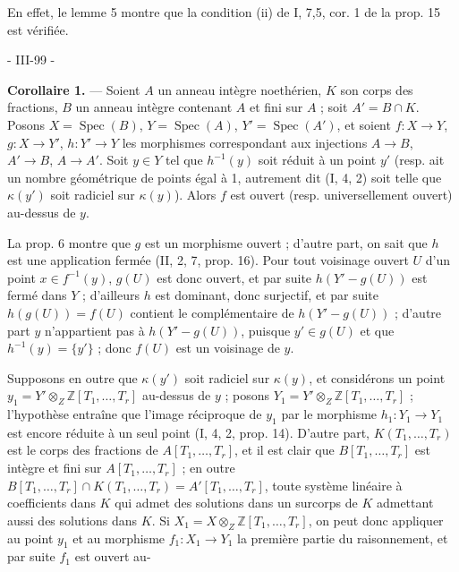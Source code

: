 En effet, le lemme 5 montre que la condition (ii) de I, 7,5, cor. 1 de la prop. 15 est vérifiée.

\newpage


- III-99 -

\textbf{Corollaire 1.} — Soient $A$ un anneau intègre noethérien, $K$ son corps des fractions, $B$ un anneau intègre contenant $A$ et fini sur $A$ ; soit $A' = B \cap K$. Posons $X = \operatorname{Spec}(B)$, $Y = \operatorname{Spec}(A)$, $Y' = \operatorname{Spec}(A')$, et soient $f : X \to Y$, $g : X \to Y'$, $h : Y' \to Y$ les morphismes correspondant aux injections $A \to B$, $A' \to B$, $A \to A'$. Soit $y \in Y$ tel que $h^{-1}(y)$ soit réduit à un point $y'$ (resp. ait un nombre géométrique de points égal à 1, autrement dit (I, 4, 2) soit telle que $\kappa(y')$ soit radiciel sur $\kappa(y)$). Alors $f$ est ouvert (resp. universellement ouvert) au-dessus de $y$.

La prop. 6 montre que $g$ est un morphisme ouvert ; d'autre part, on sait que $h$ est une application fermée (II, 2, 7, prop. 16). Pour tout voisinage ouvert $U$ d'un point $x \in f^{-1}(y)$, $g(U)$ est donc ouvert, et par suite $h(Y' - g(U))$ est fermé dans $Y$ ; d'ailleurs $h$ est dominant, donc surjectif, et par suite $h(g(U)) = f(U)$ contient le complémentaire de $h(Y' - g(U))$ ; d'autre part $y$ n'appartient pas à $h(Y' - g(U))$, puisque $y' \in g(U)$ et que $h^{-1}(y) = \{y'\}$ ; donc $f(U)$ est un voisinage de $y$. 

Supposons en outre que $\kappa(y')$ soit radiciel sur $\kappa(y)$, et considérons un point $y_1 = Y' \otimes_Z \mathbb{Z}[T_1, \dots, T_r]$ au-dessus de $y$ ; posons $Y_1 = Y' \otimes_Z \mathbb{Z}[T_1, \dots, T_r]$ ; l'hypothèse entraîne que l'image réciproque de $y_1$ par le morphisme $h_1 : Y_1 \to Y_1$ est encore réduite à un seul point (I, 4, 2, prop. 14). D'autre part, $K(T_1, \dots, T_r)$ est le corps des fractions de $A[T_1, \dots, T_r]$, et il est clair que $B[T_1, \dots, T_r]$ est intègre et fini sur $A[T_1, \dots, T_r]$ ; en outre $B[T_1, \dots, T_r] \cap K(T_1, \dots, T_r) = A'[T_1, \dots, T_r]$, toute système linéaire à coefficients dans $K$ qui admet des solutions dans un surcorps de $K$ admettant aussi des solutions dans $K$. Si $X_1 = X \otimes_Z \mathbb{Z}[T_1, \dots, T_r]$, on peut donc appliquer au point $y_1$ et au morphisme $f_1 : X_1 \to Y_1$ la première partie du raisonnement, et par suite $f_1$ est ouvert au-

\newpage

